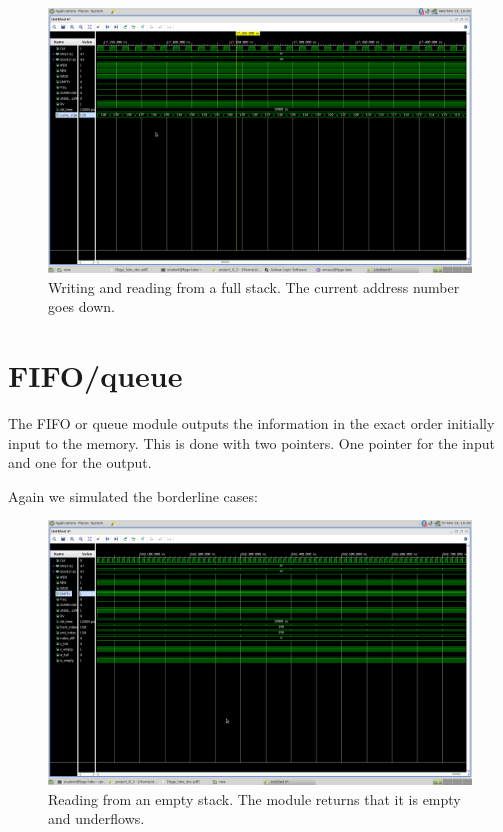 \begin{figure}
    \includegraphics[width=.9\textwidth]{L8/E2/sim_read_write_full.png}
    \caption{Writing and reading from a full stack. The current address number goes down.}
    \label{pic: w and r from f stack}
\end{figure}

\newpage

\section{FIFO/queue}

The FIFO or queue module outputs the information in the exact order initially input to the memory. This is done with two pointers. One pointer for the input and one for the output.



%

%

Again we simulated the borderline cases:

\begin{figure}
    \includegraphics[width=.9\textwidth]{L8/E3/empty_read.png}
    \caption{Reading from an empty stack. The module returns that it is empty and underflows.}
    \label{pic: r from e stack fifo}
\end{figure}

